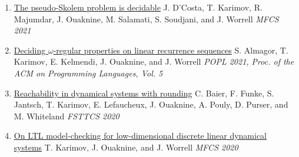 \documentclass{article}
\begin{document}
\begin{enumerate}
		\item \href{https://drops.dagstuhl.de/entities/document/10.4230/LIPIcs.MFCS.2021.34}{\large The pseudo-Skolem problem is decidable}
            \vspace{0.2cm}\newline
            J. D'Costa, T. Karimov, R. Majumdar, J. Ouaknine, M. Salamati, S. Soudjani, and J. Worrell
		\vspace*{0.25cm}\newline \emph{MFCS 2021}
            \vspace*{0.2cm}
		
		\item 
            \href{https://dl.acm.org/doi/10.2145/3434329}{\large Deciding $\omega$-regular properties on linear recurrence sequences}
            \vspace{0.2cm}\newline
            S. Almagor, T. Karimov, E. Kelmendi, J. Ouaknine, and J. Worrell
            \vspace*{0.25cm}\newline
		\emph{POPL 2021, Proc. of the ACM on Programming Languages, Vol. 5}
            \vspace*{0.2cm}
		
		\item 
            \href{https://drops.dagstuhl.de/entities/document/10.4230/LIPIcs.FSTTCS.2020.36}{\large Reachability in dynamical systems with rounding} 
            \vspace{0.2cm}
            \newline
            C. Baier, F. Funke, S. Jantsch, T. Karimov, E. Lefaucheux, J. Ouaknine,
		A. Pouly, D. Purser, and M. Whiteland
            \vspace*{0.25cm}\newline                 
            \emph{FSTTCS 2020}
            \vspace*{0.2cm}
		
		\item 
            \href{https://drops.dagstuhl.de/entities/document/10.4230/LIPIcs.MFCS.2020.54}{\large On LTL model-checking for low-dimensional discrete linear dynamical systems}
            \vspace{0.25cm}\newline       
            T. Karimov, J. Ouaknine, and J. Worrell
		\vspace*{0.2cm}\newline \emph{MFCS 2020}
	\end{enumerate}
\end{document}
